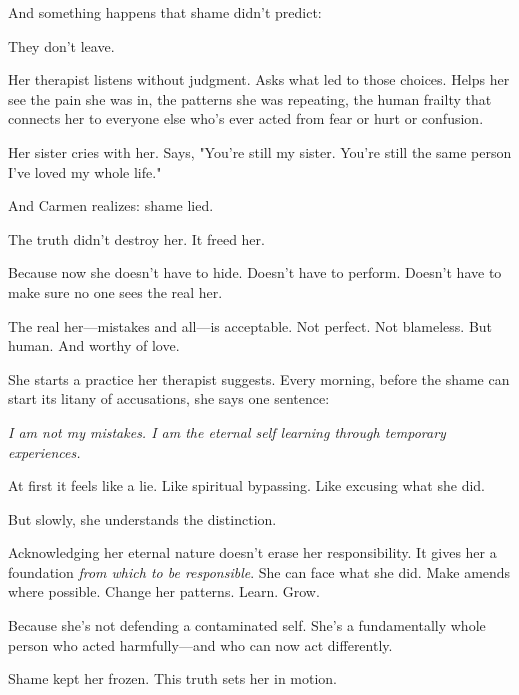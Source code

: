\documentclass[11pt,twoside]{book}
\begin{document}
And something happens that shame didn't predict:

They don't leave.

Her therapist listens without judgment. Asks what led to those choices. Helps her see the pain she was in, the patterns she was repeating, the human frailty that connects her to everyone else who's ever acted from fear or hurt or confusion.

Her sister cries with her. Says, "You're still my sister. You're still the same person I've loved my whole life."

And Carmen realizes: shame lied.

The truth didn't destroy her. It freed her.

Because now she doesn't have to hide. Doesn't have to perform. Doesn't have to make sure no one sees the real her.

The real her—mistakes and all—is acceptable. Not perfect. Not blameless. But human. And worthy of love.

She starts a practice her therapist suggests. Every morning, before the shame can start its litany of accusations, she says one sentence:

\emph{I am not my mistakes. I am the eternal self learning through temporary experiences.}

At first it feels like a lie. Like spiritual bypassing. Like excusing what she did.

But slowly, she understands the distinction.

Acknowledging her eternal nature doesn't erase her responsibility. It gives her a foundation \emph{from which to be responsible}. She can face what she did. Make amends where possible. Change her patterns. Learn. Grow.

Because she's not defending a contaminated self. She's a fundamentally whole person who acted harmfully—and who can now act differently.

Shame kept her frozen. This truth sets her in motion.
\end{document}
